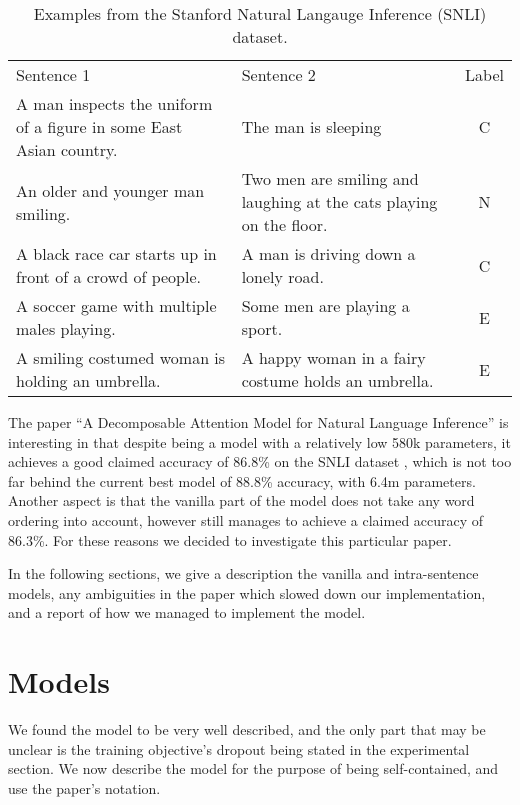 \documentclass{article}
\begin{document}
\begin{table}[htbp]\centering
\setlength\tabcolsep{2pt}
\begin{tabular}{|p{7.5cm}|p{7.5cm}|c|}
    \hline
    Sentence 1 & Sentence 2 & Label \\ \hhline{|===|}
    A man inspects the uniform of a figure in some East Asian country. & The man is sleeping & C \\ \hline
    An older and younger man smiling. & Two men are smiling and laughing at the cats playing on the floor. & N \\ \hline
    A black race car starts up in front of a crowd of people. & A man is driving down a lonely road. & C \\ \hline
    A soccer game with multiple males playing. & Some men are playing a sport. & E \\ \hline
    A smiling costumed woman is holding an umbrella. & A happy woman in a fairy costume holds an umbrella. & E \\ \hline
\end{tabular}
\caption{Examples from the Stanford Natural Langauge Inference (SNLI) dataset.}
\label{table:examples}
\end{table}

The paper ``A Decomposable Attention Model for Natural Language Inference'' \citep{parikh_decomposable_2016} is interesting in that despite being a model with a relatively low 580k parameters, it achieves a good claimed accuracy of 86.8\% on the SNLI dataset \citep{snli:emnlp2015}, which is not too far behind the current best model of 88.8\% accuracy, with 6.4m parameters. Another aspect is that the vanilla part of the model does not take any word ordering into account, however still manages to achieve a claimed accuracy of 86.3\%. For these reasons we decided to investigate this particular paper.

In the following sections, we give a description the vanilla and intra-sentence models, any ambiguities in the paper which slowed down our implementation, and a report of how we managed to implement the model.

\section{Models}
We found the model to be very well described, and the only part that may be unclear is the training objective's dropout being stated in the experimental section. We now describe the model for the purpose of being self-contained, and use the paper's notation.
\end{document}
